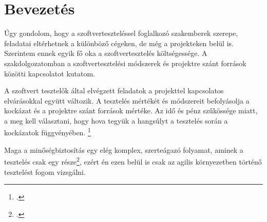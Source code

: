 \section{Bevezetés}
Úgy gondolom, hogy a szoftverteszteléssel foglalkozó szakemberek szerepe, feladatai eltérhetnek a különböző cégeken, de még a projekteken belül is.
Szerintem ennek egyik fő oka a szoftvertesztelés költségessége. A szakdolgozatomban a szoftvertesztelési módszerek és projektre szánt források közötti kapcsolatot kutatom.

A szoftvert tesztelők által elvégzett feladatok a projekttel kapcsolatos elvárásokkal együtt változik.
A tesztelés mértékét és módszereit befolyásolja a kockázat és a projektre szánt források mértéke. Az idő és pénz szűkössége miatt, a meg kell választani, hogy hova tegyük a hangsúlyt a tesztelés során a kockázatok függvényében. \footcite{istqbfoundations}

Maga a minőségbiztosítás egy elég komplex, szerteágazó folyamat, aminek a tesztelés csak egy része\footcite{softwarequalityassurance2016}, ezért én ezen belül is csak az agilis környezetben történő tesztelést fogom vizsgálni.